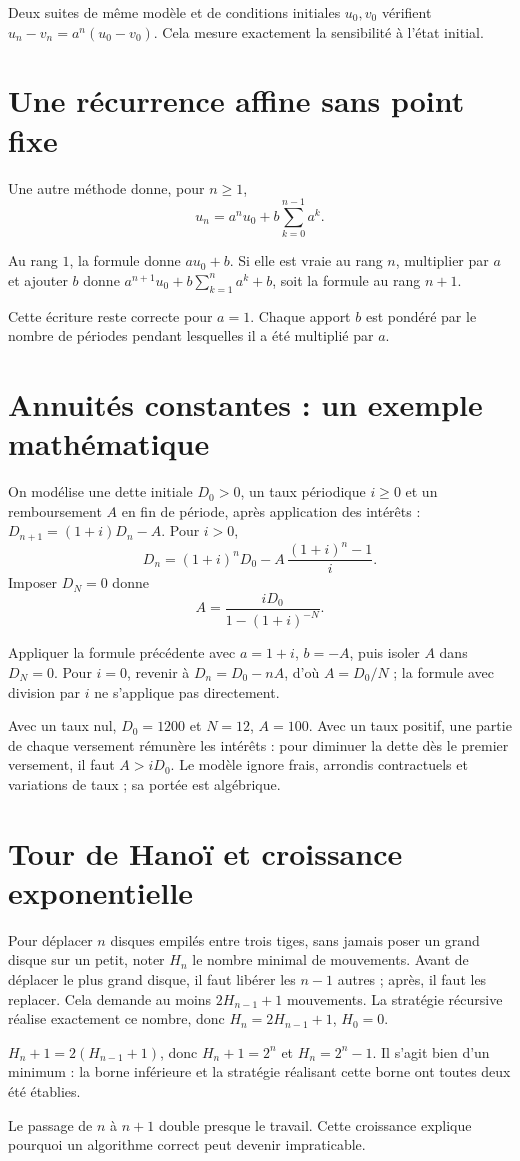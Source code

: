 \documentclass[../cours_1re.tex]{subfiles}
\begin{document}
Deux suites de même modèle et de conditions initiales $u_0,v_0$ vérifient
$u_n-v_n=a^n(u_0-v_0)$. Cela mesure exactement la sensibilité à l'état initial.
\section{Une récurrence affine sans point fixe}
Une autre méthode donne, pour $n\ge1$,
\[
u_n=a^nu_0+b\sum_{k=0}^{n-1}a^k.
\]
\begin{demonstration}
Au rang $1$, la formule donne $au_0+b$. Si elle est vraie au rang $n$, multiplier par $a$ et ajouter $b$ donne
$a^{n+1}u_0+b\sum_{k=1}^{n}a^k+b$, soit la formule au rang $n+1$.
\end{demonstration}
Cette écriture reste correcte pour $a=1$. Chaque apport $b$ est pondéré par le nombre de périodes pendant lesquelles il a été multiplié par $a$.
\section{Annuités constantes : un exemple mathématique}
On modélise une dette initiale $D_0>0$, un taux périodique $i\ge0$ et un remboursement $A$ en fin de période, après application des intérêts :
$D_{n+1}=(1+i)D_n-A$.
Pour $i>0$,
\[
D_n=(1+i)^nD_0-A\,\frac{(1+i)^n-1}{i}.
\]
Imposer $D_N=0$ donne
\[
A=\frac{iD_0}{1-(1+i)^{-N}}.
\]
\begin{demonstration}
Appliquer la formule précédente avec $a=1+i$, $b=-A$, puis isoler $A$ dans $D_N=0$. Pour $i=0$, revenir à $D_n=D_0-nA$, d'où $A=D_0/N$ ; la formule avec division par $i$ ne s'applique pas directement.
\end{demonstration}
\begin{exemple}
Avec un taux nul, $D_0=1200$ et $N=12$, $A=100$. Avec un taux positif, une partie de chaque versement rémunère les intérêts : pour diminuer la dette dès le premier versement, il faut $A>iD_0$.
Le modèle ignore frais, arrondis contractuels et variations de taux ; sa portée est algébrique.
\end{exemple}
\section{Tour de Hanoï et croissance exponentielle}
\approfondissement Pour déplacer $n$ disques empilés entre trois tiges, sans jamais poser un grand disque sur un petit, noter $H_n$ le nombre minimal de mouvements.
Avant de déplacer le plus grand disque, il faut libérer les $n-1$ autres ; après, il faut les replacer. Cela demande au moins $2H_{n-1}+1$ mouvements. La stratégie récursive réalise exactement ce nombre, donc
$H_n=2H_{n-1}+1$, $H_0=0$.
\begin{demonstration}
$H_n+1=2(H_{n-1}+1)$, donc $H_n+1=2^n$ et $H_n=2^n-1$. Il s'agit bien d'un minimum : la borne inférieure et la stratégie réalisant cette borne ont toutes deux été établies.
\end{demonstration}
Le passage de $n$ à $n+1$ double presque le travail. Cette croissance explique pourquoi un algorithme correct peut devenir impraticable.
\end{document}
